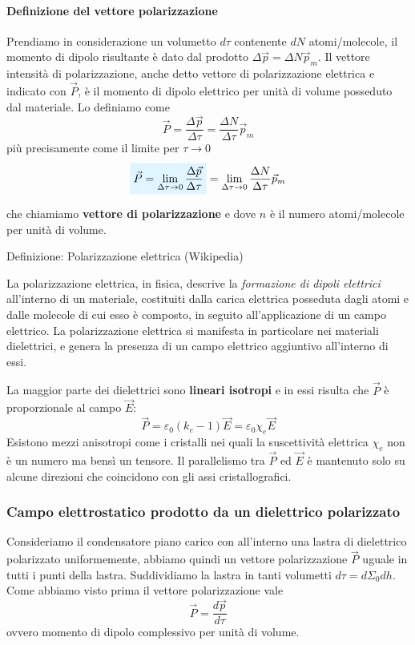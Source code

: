 \documentclass[x11names]{report}
\newcommand{\definizione}[2]{
	\begin{center}
		\fboxsep11pt
		\colorbox{myblue}{\begin{minipage}{5.75in}
				\begin{blues}{Definizione: #1}
					#2
				\end{blues}
		\end{minipage}}
	\end{center}
}
\newcommand{\viola}[1]{%
	\colorbox{myblue}{$\displaystyle #1$}
}
\begin{document}
\paragraph*{Definizione del vettore polarizzazione}
Prendiamo in considerazione un volumetto \(d\tau\) contenente \(dN\) atomi/molecole, il momento di dipolo risultante è dato dal prodotto \(\Delta\vec{p} = \Delta N \vec{p}_m\).  Il vettore intensità di polarizzazione, anche detto vettore di polarizzazione elettrica e indicato con \(\vec{P}\), è il momento di dipolo elettrico per unità di volume posseduto dal materiale. Lo definiamo come
\[
\vec{P} =\frac{\Delta \vec{p}}{\Delta\tau} = \frac{\Delta N}{\Delta \tau}\vec{p}_m
\]
più precisamente come il limite per \(\tau \to 0\)
\begin{equation}
\viola{\vec{P} = \lim_{\Delta\tau\to 0}\frac{\Delta \vec{p}}{\Delta\tau}} = \lim_{\Delta\tau\to 0}\frac{\Delta N}{\Delta \tau}\vec{p}_m
\end{equation}


che chiamiamo \textbf{vettore di polarizzazione} e dove \(n\) è il numero atomi/molecole per unità di volume. 
\definizione{Polarizzazione elettrica (Wikipedia)}{
La polarizzazione elettrica, in fisica, descrive la \textit{formazione di dipoli elettrici} all'interno di un materiale, costituiti dalla carica elettrica posseduta dagli atomi e dalle molecole di cui esso è composto, in seguito all'applicazione di un campo elettrico. La polarizzazione elettrica si manifesta in particolare nei materiali dielettrici, e genera la presenza di un campo elettrico aggiuntivo all'interno di essi.}


La maggior parte dei dielettrici sono \textbf{lineari isotropi} e in essi risulta che \(\vec{P}\) è proporzionale al campo \(\vec{E}\):
\[
\vec{P} = \varepsilon_0(k_e -1)\vec{E} = \varepsilon_0 \chi_e \vec{E}
\]
Esistono mezzi anisotropi come i cristalli nei quali la suscettività elettrica \(\chi_e\) non è un numero ma bensì un tensore. Il parallelismo tra \(\vec{P}\) ed \(\vec{E}\) è mantenuto solo su alcune direzioni che coincidono con gli assi cristallografici.

\subsubsection{Campo elettrostatico prodotto da un dielettrico polarizzato}
Consideriamo il condensatore piano carico con all'interno una lastra di dielettrico polarizzato uniformemente, abbiamo quindi un vettore polarizzazione \(\vec{P}\) uguale in tutti i punti della lastra. Suddividiamo la lastra in tanti volumetti \(d\tau = d\Sigma_0 dh\). Come abbiamo visto prima il vettore polarizzazione vale
\[
\vec{P} = \frac{d\vec{p}}{d\tau}
\]
ovvero momento di dipolo complessivo per unità di volume.
\end{document}
